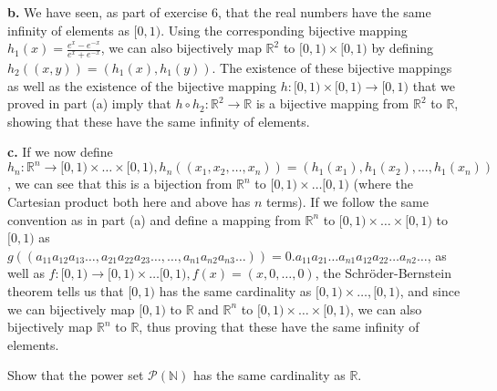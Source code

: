 \begin{solution}
    \textbf{b.} We have seen, as part of exercise 6, that the real numbers have the same infinity of elements as $[0, 1)$. Using the corresponding bijective mapping $h_1(x) = \frac{e^x - e^{-x}}{e^x + e^{-x}}$, we can also bijectively map $\mathbb{R}^2$ to $[0, 1) \times [0,1)$ by defining $h_2((x, y)) = (h_1(x), h_1(y))$. The existence of these bijective mappings as well as the existence of the bijective mapping $h: [0, 1) \times [0, 1) \rightarrow [0, 1)$ that we proved in part (a) imply that $h \circ h_2 : \mathbb{R}^2 \rightarrow \mathbb{R}$ is a bijective mapping from $\mathbb{R}^2$ to $\mathbb{R}$, showing that these have the same infinity of elements.

    \textbf{c.} If we now define $h_n : \mathbb{R}^n \rightarrow [0, 1) \times \ldots \times [0, 1), h_n((x_1, x_2, \ldots, x_n)) = (h_1(x_1), h_1(x_2), \ldots, h_1(x_n))$, we can see that this is a bijection from $\mathbb{R}^n$ to $\mathbb [0, 1) \times \ldots [0, 1)$ (where the Cartesian product both here and above has $n$ terms). If we follow the same convention as in part (a) and define a mapping from $\mathbb{R}^n$ to $[0, 1) \times \ldots \times [0, 1)$ to $[0, 1)$ as $g((a_{11}a_{12}a_{13}\ldots, a_{21}a_{22}a_{23}\ldots, \ldots, a_{n1}a_{n2}a_{n3}\ldots)) = 0.a_{11}a_{21}\ldots a_{n1}a_{12}a_{22}\ldots a_{n2}\ldots$, as well as $f:[0, 1) \rightarrow [0, 1) \times \ldots [0, 1), f(x) = (x, 0, \ldots, 0)$, the Schröder-Bernstein theorem tells us that $[0, 1)$ has the same cardinality as $[0, 1) \times \ldots, [0, 1)$, and since we can bijectively map $[0, 1)$ to $\mathbb{R}$ and $\mathbb{R}^n$ to $[0, 1) \times \ldots \times [0, 1)$, we can also bijectively map $\mathbb{R}^n$ to $\mathbb{R}$, thus proving that these have the same infinity of elements.
\end{solution}

\begin{exercise}{8}
    Show that the power set $\mathcal{P}(\mathbb{N})$ has the same cardinality as $\mathbb{R}$.
\end{exercise}


